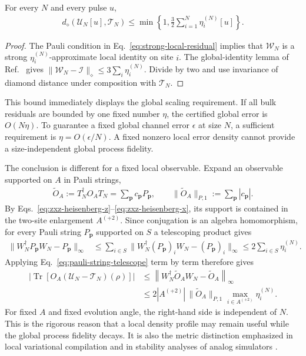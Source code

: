 \begin{proposition}
\label{prop:local-to-global-zxz}
For every $N$ and every pulse $u$,
\begin{align}
d_\diamond(\mathcal U_N[u],\mathcal T_N)
\leq
\min\left\{1,\frac{3}{2}\sum_{i=1}^{N}\eta_i^{(N)}[u]\right\}.
\label{eq:local-to-global-diamond-bound}
\end{align}
\end{proposition}

\begin{proof}
The Pauli condition in Eq.~\eqref{eq:strong-local-residual} implies that
$\mathcal W_N$ is a strong $\eta_i^{(N)}$-approximate local identity on site
$i$.  The global-identity lemma of Ref.~\cite{huang_2024_learning} gives
$\|\mathcal W_N-\mathcal I\|_\diamond\leq
3\sum_i\eta_i^{(N)}$.  Divide by two and use invariance of diamond distance
under composition with $\mathcal T_N$.
\end{proof}

This bound immediately displays the global scaling requirement.  If all bulk
residuals are bounded by one fixed number $\eta$, the certified global error is
$O(N\eta)$.  To guarantee a fixed global channel error $\epsilon$ at size
$N$, a sufficient requirement is $\eta=O(\epsilon/N)$.  A fixed nonzero local
error density cannot provide a size-independent global process fidelity.

The conclusion is different for a fixed local observable.  Expand an
observable supported on $A$ in Pauli strings,
\begin{align}
\widetilde O_A:=T_N^\dagger O_AT_N
=\sum_{\boldsymbol p}c_{\boldsymbol p}P_{\boldsymbol p},
\qquad
\|\widetilde O_A\|_{P,1}:=\sum_{\boldsymbol p}|c_{\boldsymbol p}|.
\end{align}
By Eqs.~\eqref{eq:zxz-heisenberg-z}--\eqref{eq:zxz-heisenberg-x}, its support
is contained in the two-site enlargement $A^{(+2)}$.  Since conjugation is an
algebra homomorphism, for every Pauli string $P_{\boldsymbol p}$ supported on
$S$ a telescoping product gives
\begin{align}
\|W_N^\dagger P_{\boldsymbol p}W_N-P_{\boldsymbol p}\|_\infty
&\leq\sum_{i\in S}
\|W_N^\dagger(P_{\boldsymbol p})_iW_N-(P_{\boldsymbol p})_i\|_\infty
\leq2\sum_{i\in S}\eta_i^{(N)}.
\label{eq:pauli-string-telescope}
\end{align}
Applying Eq.~\eqref{eq:pauli-string-telescope} term by term therefore gives
\begin{align}
\left|\operatorname{Tr}\left[O_A
(\mathcal U_N-\mathcal T_N)(\rho)\right]\right|
&\leq\left\|W_N^\dagger\widetilde O_AW_N-\widetilde O_A\right\|_\infty
\nonumber\\
&\leq
2|A^{(+2)}|\,\|\widetilde O_A\|_{P,1}
\max_{i\in A^{(+2)}}\eta_i^{(N)}.
\label{eq:local-observable-from-local-residual}
\end{align}
For fixed $A$ and fixed evolution angle, the right-hand side is independent of
$N$.  This is the rigorous reason that a local density profile may remain
useful while the global process fidelity decays.  It is also the metric
distinction emphasized in local variational compilation
\cite{mizuta_2022_local} and in stability analyses of analog simulators
\cite{trivedi_2024_quantum}.

